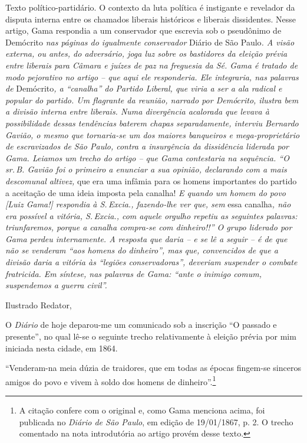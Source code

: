 \begin{didascalia}
Texto político-partidário. O contexto da luta política é instigante e
revelador da disputa interna entre os chamados liberais históricos e
liberais dissidentes. Nesse artigo, Gama respondia a um conservador que
escrevia sob o pseudônimo de Demócrito \emph{nas páginas do igualmente
conservador} Diário de São Paulo\emph{. A visão externa, ou antes, do
adversário, joga luz sobre os bastidores da eleição prévia entre
liberais para Câmara e juízes de paz na freguesia da Sé. Gama é tratado
de modo pejorativo no artigo -- que aqui ele responderia. Ele
integraria, nas palavras de} Demócrito\emph{, a ``canalha'' do Partido
Liberal, que viria a ser a ala radical e popular do partido. Um
flagrante da reunião, narrado por Demócrito, ilustra bem a divisão
interna entre liberais. Numa divergência acalorada que levava à
possibilidade dessas tendências baterem chapas separadamente, interviu
Bernardo Gavião, o mesmo que tornaria-se um dos maiores banqueiros e
mega-proprietário de escravizados de São Paulo, contra a insurgência da
dissidência liderada por Gama. Leiamos um trecho do artigo -- que Gama
contestaria na sequência. ``O sr.\,B. Gavião foi o primeiro a enunciar a
sua opinião, declarando com a mais descomunal altivez,} que era uma
infâmia para os homens importantes do partido a aceitação de uma ideia
imposta pela canalha! \emph{E quando um homem do povo {[}Luiz Gama!{]}
respondia à S.\,Excia., fazendo-lhe ver que, sem} essa canalha\emph{, não
era possível a vitória, S.\,Excia., com aquele orgulho repetiu as
seguintes palavras: triunfaremos, porque a canalha compra-se com
dinheiro!!'' O grupo liderado por Gama perdeu internamente. A resposta
que daria -- e se lê a seguir -- é de que não se venderam ``aos homens do
dinheiro'', mas que, convencidos de que a divisão daria a vitória às
``legiões conservadoras'', deveriam suspender o combate fratricida. Em
síntese, nas palavras de Gama: ``ante o inimigo comum, suspendemos a
guerra civil''.}
\end{didascalia}



Ilustrado Redator,

O \emph{Diário} de hoje deparou-me um comunicado sob a inscrição ``O
passado e presente'', no qual lê-se o seguinte trecho relativamente à
eleição prévia por mim iniciada nesta cidade, em 1864.

``Venderam-na meia dúzia de traidores, que em todas as épocas fingem-se
sinceros amigos do povo e vivem à soldo dos homens de
dinheiro''.\footnote{A citação confere com o original e, como Gama
  menciona acima, foi publicada no \emph{Diário de São Paulo}, em edição
  de 19/01/1867, p. 2. O trecho comentado na nota introdutória ao artigo
  provém desse texto.}

